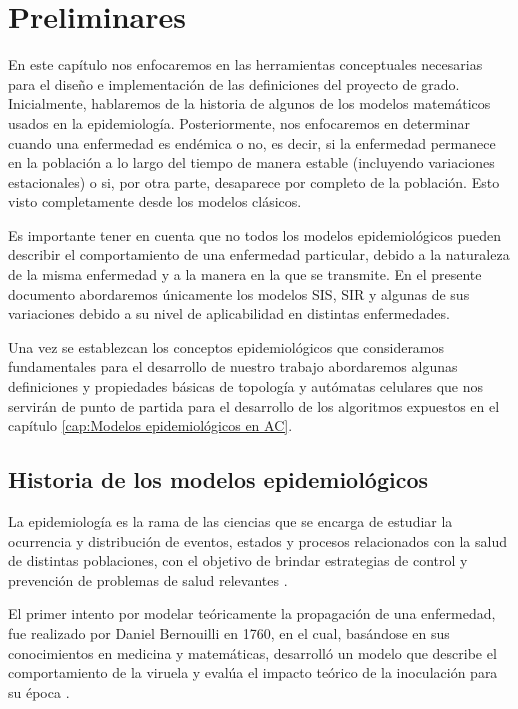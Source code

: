 \chapter{Preliminares}\label{cap:Preliminares}

En este capítulo nos enfocaremos en las herramientas conceptuales necesarias para el diseño e implementación de las definiciones del proyecto de grado. Inicialmente, hablaremos de la historia de algunos de los modelos matemáticos usados en la epidemiología. Posteriormente, nos enfocaremos en determinar cuando una enfermedad es endémica o no, es decir, si la enfermedad permanece en la población a lo largo del tiempo de manera estable (incluyendo variaciones estacionales) o si, por otra parte, desaparece por completo de la población. Esto visto completamente desde los modelos clásicos.

Es importante tener en cuenta que no todos los modelos epidemiológicos pueden describir el comportamiento de una enfermedad particular, debido a la naturaleza de la misma enfermedad y a la manera en la que se transmite. En el presente documento abordaremos únicamente los modelos SIS, SIR y algunas de sus variaciones debido a su nivel de aplicabilidad en distintas enfermedades.

Una vez se establezcan los conceptos epidemiológicos que consideramos fundamentales para el desarrollo de nuestro trabajo abordaremos algunas definiciones y propiedades básicas de topología y autómatas celulares que nos servirán de punto de partida para el desarrollo de los algoritmos expuestos en el capítulo \ref{cap:Modelos epidemiológicos en AC}.

\section{Historia de los modelos epidemiológicos}\label{sec:HistoriaEpidemiología}
La epidemiología es la rama de las ciencias que se encarga de estudiar la ocurrencia y distribución de eventos, estados y procesos relacionados con la salud de distintas poblaciones, con el objetivo de brindar estrategias de control y prevención de problemas de salud relevantes \cite{epiDictionary}.

El primer intento por modelar teóricamente la propagación de una enfermedad, fue realizado por Daniel Bernouilli en 1760, en el cual, basándose en sus conocimientos en medicina y matemáticas, desarrolló un modelo que describe el comportamiento de la viruela y evalúa el impacto teórico de la inoculación para su época \cite{shortHistory}. 

